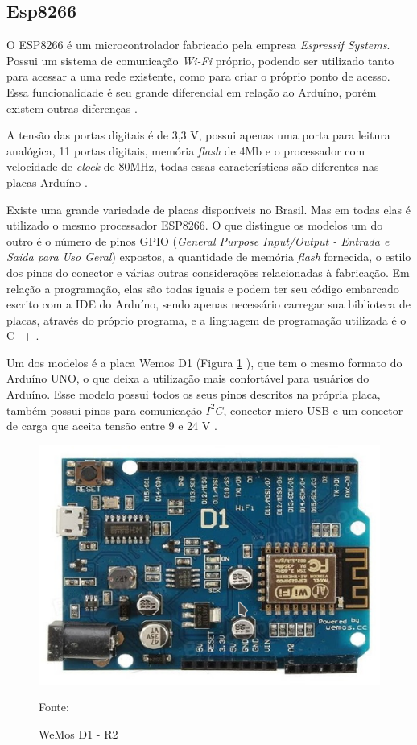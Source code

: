 \subsection{Esp8266}

O ESP8266 é  um microcontrolador  fabricado pela empresa \textit{Espressif Systems}. Possui um sistema de comunicação \textit{Wi-Fi }próprio, podendo ser utilizado tanto para acessar a uma rede existente, como para criar o próprio ponto de acesso.  Essa funcionalidade é seu grande diferencial em relação ao Arduíno, porém existem outras diferenças \cite{oliveira2017}. 

A tensão das portas digitais é de 3,3 V, possui apenas uma porta para leitura analógica, 11 portas digitais, memória \textit{flash} de 4Mb e o processador com velocidade de \textit{clock} de 80MHz, todas essas características são diferentes nas placas Arduíno \cite{wemos2017}.

Existe uma grande variedade de placas disponíveis no Brasil.  Mas em todas elas é utilizado o mesmo processador ESP8266. O que distingue os modelos um do outro é o número de pinos GPIO (\textit{General Purpose Input/Output - Entrada e Saída para Uso Geral}) expostos, a quantidade de memória \textit{flash} fornecida, o estilo dos pinos do conector e várias outras considerações relacionadas à fabricação.  Em relação a  programação, elas são todas iguais e podem ter seu código embarcado escrito com a IDE do Arduíno, sendo apenas necessário carregar sua biblioteca de placas, através do próprio programa, e a linguagem de programação utilizada é o C++  \cite{kolban2016}.

Um dos modelos é a placa Wemos D1 (Figura \ref{wemosd1} ), que tem o mesmo formato do Arduíno UNO, o que deixa a utilização mais confortável para usuários do Arduíno. Esse modelo possui todos os seus pinos descritos na própria placa, também possui pinos para comunicação $I^2C$, conector micro USB e um conector de carga que aceita tensão entre 9 e 24 V \cite{kolban2016}\cite{wemos2017}.

\begin{figure}[h!]
	\centering
	\includegraphics[keepaspectratio=true,scale=0.7
	]{figuras/wemosd1.png}
	\caption{ WeMos D1 - R2 }
	Fonte: \cite{wemos2017}
	\label{wemosd1}	
\end{figure}

